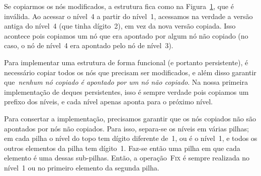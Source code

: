 \documentclass[main.tex]{subfiles}
\begin{document}
\begin{figure}
\centering
{}
\caption{} \label{fig:func_ex1res}
\end{figure}

Se copiarmos os nós modificados, a estrutura fica como na Figura~\ref{fig:func_ex1res}, que é inválida. Ao acessar o nível~4 a partir do nível~1, acessamos na verdade a versão antiga do nível~4 (que tinha dígito~2), em vez da nova versão copiada. Isso acontece pois copiamos um nó que era apontado por algum nó não copiado (no caso, o nó de nível~4 era apontado pelo nó de nível~3).

Para implementar uma estrutura de forma funcional (e portanto persistente), é necessário copiar todos os nós que precisam ser modificados, e além disso garantir que~\emph{nenhum nó copiado é apontado por um nó não copiado}. Na nossa primeira implementação de deques persistentes, isso é sempre verdade pois copiamos um prefixo dos níveis, e cada nível apenas aponta para o próximo nível.

Para consertar a implementação, precisamos garantir que os nós copiados não são apontados por nós não copiados. Para isso, separa-se os níveis em várias pilhas; em cada pilha o nível do topo tem dígito diferente de~1, ou é o nível~1, e todos os outros elementos da pilha tem dígito~1. Faz-se então uma pilha em que cada elemento é uma dessas sub-pilhas. Então, a operação~\textsc{Fix} é sempre realizada no nível~1 ou no primeiro elemento da segunda pilha.
\end{document}
